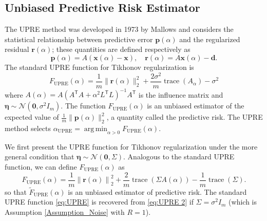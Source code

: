 \documentclass[12pt]{article}
\newcommand{\mA}{m}	%
\newcommand{\dVec}{\mathbf{d}}	%
\newcommand{\pVec}{\mathbf{p}}	%
\newcommand{\rVec}{\mathbf{r}}	%
\newcommand{\xVec}{\mathbf{x}}	%
\newcommand{\trans}[1]{{#1}^\mathsf{T}}	%
\DeclareMathOperator{\trace}{trace}		%
\newcommand{\regparam}{\alpha}  %
\newcommand{\xReg}{\xVec(\regparam)}	%
\newcommand{\xSol}{\xVec}	%
\DeclareMathOperator*{\argmin}{arg\,min}
\newcommand{\noise}{\eta}	%
\newcommand{\noiseSD}{\sigma}	%
\newcommand{\noiseVec}{\bm{\noise}}	%
\newcommand{\A}{A(\regparam)}	%
\newcommand{\U}{F_{\text{UPRE}}}	%
\newcommand{\UBig}{\widetilde{F}_{\text{UPRE}}}	%
\begin{document}
\subsection{Unbiased Predictive Risk Estimator} \label{sec:UPRE}
The UPRE method was developed in 1973 by Mallows and considers the statistical relationship between predictive error $\pVec(\regparam)$ and the regularized residual $\rVec(\regparam)$; these quantities are defined respectively as
\begin{equation}
\label{eq:Predictive Error and Regularized Residual}
\pVec(\regparam) = A(\xReg - \xSol), \quad \rVec(\regparam) = A\xReg - \dVec.
\end{equation}
The standard UPRE function for Tikhonov regularization is
\begin{equation}
\label{eq:UPRE}
\U(\alpha) = \frac{1}{\mA}\|\rVec(\regparam)\|_2^2 + \frac{2\noiseSD^2}{\mA}\trace(A_\regparam) - \noiseSD^2
\end{equation}
where $\A = A(\trans{A}A + \regparam^2\trans{L}L)^{-1}\trans{A}$ is the influence matrix and $\noiseVec \sim \mathcal{N}(\bm{0},\noiseSD^2 I_{\mA})$. The function $\U(\regparam)$ is an unbiased estimator of the expected value of $\frac{1}{\mA}\|\pVec(\regparam)\|_2^2$, a quantity called the predictive risk. The UPRE method selects $\regparam_{\textrm{UPRE}} = \argmin_{\regparam > 0} \U(\regparam)$. \par
We first present the UPRE function for Tikhonov regularization under the more general condition that $\noiseVec \sim \mathcal{N}(\bm{0},\Sigma)$. Analogous to the standard UPRE function, we can define $\U(\regparam)$ as
\begin{equation}
\label{eq:UPRE 2}
\U(\regparam) = \frac{1}{\mA}\left\|\rVec(\regparam)\right\|_2^2 + \frac{2}{\mA}\trace\left(\Sigma\A\right) - \frac{1}{\mA}\trace\left(\Sigma\right).
\end{equation}
so that $\UBig(\regparam)$ is an unbiased estimator of predictive risk. The standard UPRE function \eqref{eq:UPRE} is recovered from \eqref{eq:UPRE 2} if $\Sigma = \noiseSD^2 I_{\mA}$ (which is Assumption \ref{Assumption_Noise} with $R = 1$).
\end{document}
